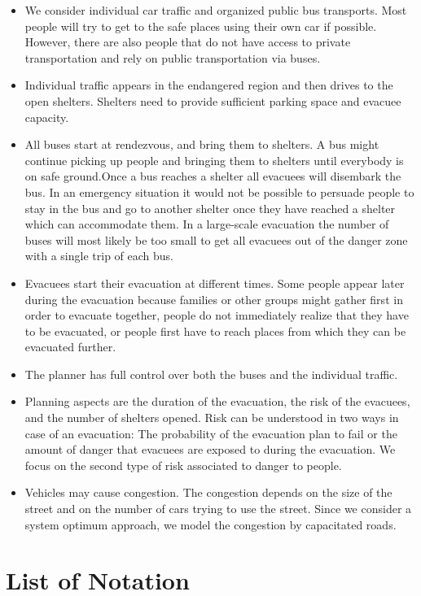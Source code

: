 \documentclass{mcmthesis}
\begin{document}
\begin{itemize}
  \item We consider individual car traffic and organized public bus transports.
        Most people will try to get to the safe places using their own car if possible. However, there are also people that do not have access to private transportation and rely on public transportation via buses.
  \item Individual traffic appears in the endangered region and then drives to the open shelters. Shelters need to provide sufficient parking space and evacuee capacity.
  \item All buses start at rendezvous, and bring them to shelters.
        A bus might continue picking up people and bringing them to shelters until everybody is on safe ground.Once a bus reaches a shelter all evacuees will disembark the bus. In an emergency situation it would not be possible to persuade people to stay in the bus and go to another shelter once they have reached a shelter which can accommodate them. In a large-scale evacuation the number of buses will most likely be too small to get all evacuees out of the danger zone with a single trip of each bus.
  \item Evacuees start their evacuation at different times.
        Some people appear later during the evacuation because families or other groups might gather first in order to evacuate together, people do not immediately realize that they have to be evacuated, or people first have to reach places from which they can be evacuated further.
  \item The planner has full control over both the buses and the individual traffic.
  \item Planning aspects are the duration of the evacuation, the risk of the evacuees, and the number of shelters opened.
        Risk can be understood in two ways in case of an evacuation: The probability of the evacuation plan to fail or the amount of danger that evacuees are exposed to during the evacuation. We focus on the second type of risk associated to danger to people.

  \item Vehicles may cause congestion.
        The congestion depends on the size of the street and on the number of cars trying to use the street. Since we consider a system optimum approach, we model the congestion by capacitated roads.
\end{itemize}

\section{List of Notation}
\end{document}
